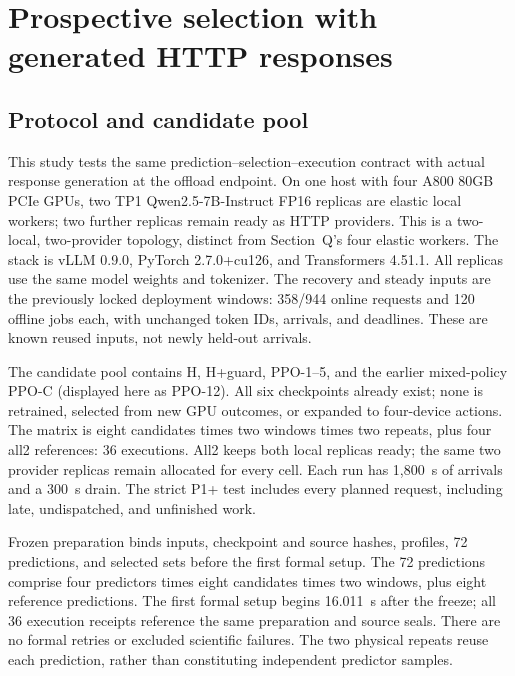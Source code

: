\section{Prospective selection with generated HTTP responses}
\label{sec:realapi}

\subsection{Protocol and candidate pool}
This study tests the same prediction--selection--execution contract with actual
response generation at the offload endpoint. On one host with four A800 80GB
PCIe GPUs, two TP1 Qwen2.5-7B-Instruct FP16 replicas are elastic local workers;
two further replicas remain ready as HTTP providers. This is a two-local,
two-provider topology, distinct from Section~Q's four elastic workers. The
stack is vLLM 0.9.0, PyTorch 2.7.0+cu126, and Transformers 4.51.1.
All replicas use the same model weights and tokenizer. The recovery and steady
inputs are the previously locked deployment windows: 358/944 online requests
and 120 offline jobs each, with unchanged token IDs, arrivals, and deadlines.
These are known reused inputs, not newly held-out arrivals.

The candidate pool contains H, H+guard, PPO-1--5, and the earlier mixed-policy
PPO-C (displayed here as PPO-12). All six checkpoints already exist; none is
retrained, selected from new GPU outcomes, or expanded to four-device actions.
The matrix is eight candidates times two windows times two repeats, plus
four all2 references: 36 executions. All2 keeps both local replicas ready;
the same two provider replicas remain allocated for every cell. Each run has
1,800~s of arrivals and a 300~s drain. The strict P1+ test includes every
planned request, including late, undispatched, and unfinished work.

Frozen preparation binds inputs, checkpoint and source hashes, profiles,
72 predictions, and selected sets before the first formal setup. The 72
predictions comprise four predictors times eight candidates times two windows,
plus eight reference predictions. The first formal setup begins 16.011~s
after the freeze; all 36 execution receipts reference the same preparation
and source seals. There are no formal retries or excluded scientific failures.
The two physical repeats reuse each prediction, rather than constituting
independent predictor samples.

